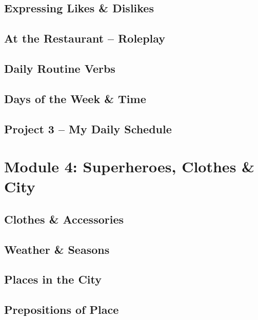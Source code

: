 \chapter{Expressing Likes \& Dislikes}\label{ch:s14}

\newpage
\chapter{At the Restaurant -- Roleplay}\label{ch:s15}

\newpage
\chapter{Daily Routine Verbs}\label{ch:s16}

\newpage
\chapter{Days of the Week \& Time}\label{ch:s17}

\newpage
\chapter{Project 3 -- My Daily Schedule}\label{ch:s18}


\clearpage
{}
\part{Module 4: Superheroes, Clothes \& City}
\newpage
\chapter{Clothes \& Accessories}\label{ch:s19}

\newpage
\chapter{Weather \& Seasons}\label{ch:s20}

\newpage
\chapter{Places in the City}\label{ch:s21}

\newpage
\chapter{Prepositions of Place}\label{ch:s22}

\newpage
